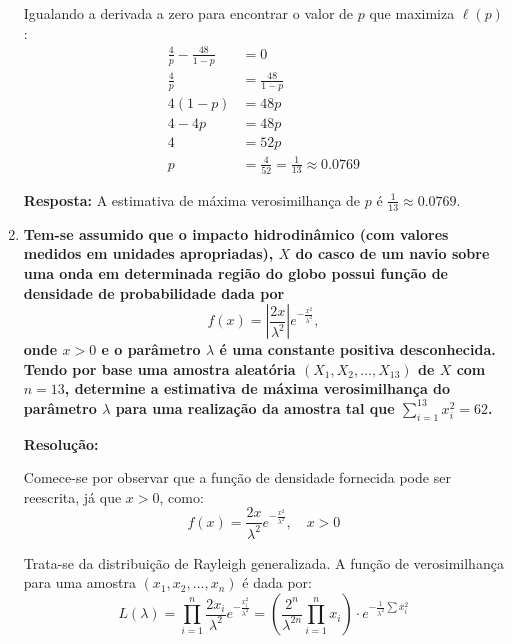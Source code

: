 \documentclass[a4paper,12pt]{article}
\begin{document}
\begin{enumerate}
\begin{mdframed}[backgroundcolor=gray!10, linewidth=0pt, innertopmargin=10pt, innerbottommargin=10pt]
    Igualando a derivada a zero para encontrar o valor de $p$ que maximiza $\ell(p)$:
    \begin{align*}
    \frac{4}{p} - \frac{48}{1-p} &= 0 \\
    \frac{4}{p} &= \frac{48}{1-p} \\
    4(1-p) &= 48p \\
    4 - 4p &= 48p \\
    4 &= 52p \\
    p &= \frac{4}{52} = \frac{1}{13} \approx 0.0769
    \end{align*}

    \textbf{Resposta:} A estimativa de máxima verosimilhança de $p$ é $\frac{1}{13} \approx 0.0769$.
    \end{mdframed}

    \vspace{0.5cm}

    \item \textbf{Tem-se assumido que o impacto hidrodinâmico (com valores medidos em unidades apropriadas), \( X \) do casco de um navio sobre uma onda em determinada região do globo possui função de densidade de probabilidade dada por}
    \[
    f(x) = \left| \frac{2x}{\lambda^2} \right| e^{-\frac{x^2}{\lambda^2}},
    \]
    \textbf{onde \( x > 0 \) e o parâmetro \( \lambda \) é uma constante positiva desconhecida. Tendo por base uma amostra aleatória \( (X_1, X_2, \ldots, X_{13}) \) de \( X \) com \( n = 13 \), determine a estimativa de máxima verosimilhança do parâmetro \( \lambda \) para uma realização da amostra tal que \( \sum_{i=1}^{13} x_i^2 = 62 \).}

    \vspace{0.3cm}

    \begin{mdframed}[backgroundcolor=gray!10, linewidth=0pt, innertopmargin=10pt, innerbottommargin=10pt]
    \textbf{Resolução:}

    Comece-se por observar que a função de densidade fornecida pode ser reescrita, já que \( x > 0 \), como:
    \[
    f(x) = \frac{2x}{\lambda^2} e^{-\frac{x^2}{\lambda^2}}, \quad x > 0
    \]

    Trata-se da distribuição de Rayleigh generalizada. A função de verosimilhança para uma amostra \( (x_1, x_2, \ldots, x_n) \) é dada por:
    \[
    L(\lambda) = \prod_{i=1}^n \frac{2x_i}{\lambda^2} e^{-\frac{x_i^2}{\lambda^2}} = \left( \frac{2^n}{\lambda^{2n}} \prod_{i=1}^n x_i \right) \cdot e^{-\frac{1}{\lambda^2} \sum x_i^2}
    \]


\end{mdframed}
\end{enumerate}
\end{document}
